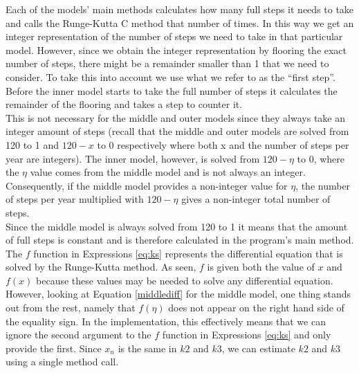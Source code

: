 Each of the models' main methods calculates how many full steps it needs to take and calls the Runge-Kutta C method that number of times. In this way we get an integer representation of the number of steps we need to take in that particular model. However, since we obtain the integer representation by flooring the exact number of steps, there might be a remainder smaller than 1 that we need to consider. To take this into account we use what we refer to as the ``first step''. Before the inner model starts to take the full number of steps it calculates the remainder of the flooring and takes a step to counter it. \\

This is not necessary for the middle and outer models since they always take an integer amount of steps (recall that the middle and outer models are solved from 120 to 1 and $120-x$ to 0 respectively where both x and the number of steps per year are integers). The inner model, however, is solved from $120-\eta$ to 0, where the $\eta$ value comes from the middle model and is not always an integer. Consequently, if the middle model provides a non-integer value for $\eta$, the number of steps per year multiplied with $120-\eta$ gives a non-integer total number of steps. \\

Since the middle model is always solved from 120 to 1 it means that the amount of full steps is constant and is therefore calculated in the program's main method. \\

The $f$ function in Expressions \ref{eq:ks} represents the differential equation that is solved by the Runge-Kutta method. As seen, $f$ is given both the value of $x$ and $f(x)$ because these values may be needed to solve any differential equation. However, looking at Equation \ref{middlediff} for the middle model, one thing stands out from the rest, namely that $f(\eta)$ does not appear on the right hand side of the equality sign. In the implementation, this effectively means that we can ignore the second argument to the $f$ function in Expressions \ref{eq:ks} and only provide the first. Since $x_n$ is the same in $k2$ and $k3$, we can estimate $k2$ and $k3$ using a single method call. 














